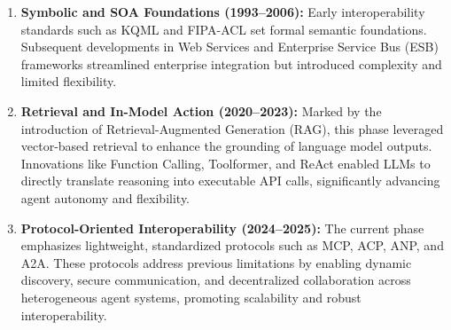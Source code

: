 \documentclass{article}
\begin{document}
\begin{enumerate}
    \item \textbf{Symbolic and SOA Foundations (1993–2006):} Early interoperability standards such as KQML and FIPA-ACL set formal semantic foundations. Subsequent developments in Web Services and Enterprise Service Bus (ESB) frameworks streamlined enterprise integration but introduced complexity and limited flexibility.
    
    \item \textbf{Retrieval and In-Model Action (2020–2023):} Marked by the introduction of Retrieval-Augmented Generation (RAG), this phase leveraged vector-based retrieval to enhance the grounding of language model outputs. Innovations like Function Calling, Toolformer, and ReAct enabled LLMs to directly translate reasoning into executable API calls, significantly advancing agent autonomy and flexibility.
    
    \item \textbf{Protocol-Oriented Interoperability (2024–2025):} The current phase emphasizes lightweight, standardized protocols such as MCP, ACP, ANP, and A2A. These protocols address previous limitations by enabling dynamic discovery, secure communication, and decentralized collaboration across heterogeneous agent systems, promoting scalability and robust interoperability.
\end{enumerate}








\end{document}
